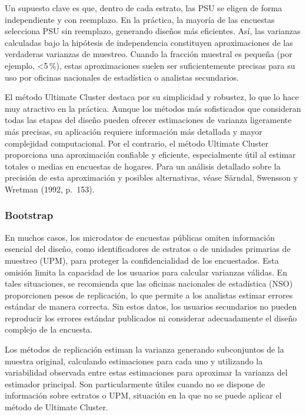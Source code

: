 \documentclass[
  spanish,
  12pt,
]{book}
\begin{document}
Un supuesto clave es que, dentro de cada estrato, las PSU se eligen de forma independiente y con reemplazo. En la práctica, la mayoría de las encuestas selecciona PSU sin reemplazo, generando diseños más eficientes. Así, las varianzas calculadas bajo la hipótesis de independencia constituyen aproximaciones de las verdaderas varianzas de muestreo. Cuando la fracción muestral es pequeña (por ejemplo, \textless5\,\%), estas aproximaciones suelen ser suficientemente precisas para su uso por oficinas nacionales de estadística o analistas secundarios.

El método Ultimate Cluster destaca por su simplicidad y robustez, lo que lo hace muy atractivo en la práctica. Aunque los métodos más sofisticados que consideran todas las etapas del diseño pueden ofrecer estimaciones de varianza ligeramente más precisas, su aplicación requiere información más detallada y mayor complejidad computacional. Por el contrario, el método Ultimate Cluster proporciona una aproximación confiable y eficiente, especialmente útil al estimar totales o medias en encuestas de hogares. Para un análisis detallado sobre la precisión de esta aproximación y posibles alternativas, véase Särndal, Swensson y Wretman (1992, p.~153).

\subsubsection*{Bootstrap}\label{bootstrap}

En muchos casos, los microdatos de encuestas públicas omiten información esencial del diseño, como identificadores de estratos o de unidades primarias de muestreo (UPM), para proteger la confidencialidad de los encuestados. Esta omisión limita la capacidad de los usuarios para calcular varianzas válidas. En tales situaciones, se recomienda que las oficinas nacionales de estadística (NSO) proporcionen pesos de replicación, lo que permite a los analistas estimar errores estándar de manera correcta. Sin estos datos, los usuarios secundarios no pueden reproducir los errores estándar publicados ni considerar adecuadamente el diseño complejo de la encuesta.

Los métodos de replicación estiman la varianza generando subconjuntos de la muestra original, calculando estimaciones para cada uno y utilizando la variabilidad observada entre estas estimaciones para aproximar la varianza del estimador principal. Son particularmente útiles cuando no se dispone de información sobre estratos o UPM, situación en la que no se puede aplicar el método de Ultimate Cluster.
\end{document}
